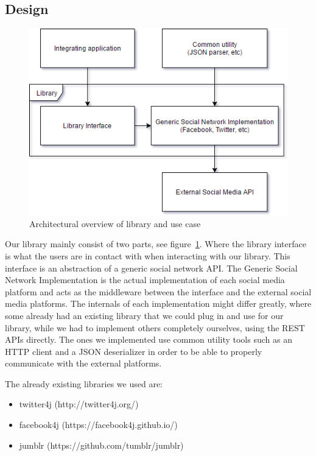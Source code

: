 \documentclass{sigchi-alternate}
\begin{document}
\subsection{Design}
\begin{figure}
	\includegraphics[width=\columnwidth]{LibraryImplementation.png}
	\caption{Architectural overview of library and use case}
	\label{fig:architecturalOverview}
\end{figure}
Our library mainly consist of two parts, see figure~\ref{fig:architecturalOverview}. Where the library interface is what the users are in contact with when interacting with our library. This interface is an abstraction
of a generic social network API. The Generic Social Network Implementation is the actual implementation of each social media platform and acts as the middleware between the interface and the 
external social media platforms.
The internals of each implementation might differ greatly, where some already had an existing library that we could plug in and use for our library, while we had to implement others completely
ourselves, using the REST APIs directly. The ones we implemented use common utility tools such as an HTTP client and a JSON deserializer in order to be able to properly communicate with the external
platforms.

The already existing libraries we used are:
\begin{itemize}
	\item twitter4j (http://twitter4j.org/)
	\item facebook4j (https://facebook4j.github.io/)
	\item jumblr (https://github.com/tumblr/jumblr)
\end{itemize}
\end{document}
